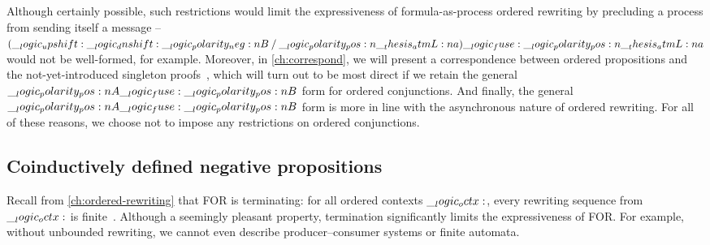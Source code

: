 Although certainly possible, such restrictions would limit the expressiveness of formula-as-process ordered rewriting by precluding a process from sending itself a message -- $(\__logic_upshift: \__logic_dnshift: \__logic_polarity_neg:n {B} \mathbin { / } \__logic_polarity_pos:n {\__thesis_atmL:n {a}}) \__logic_fuse: \__logic_polarity_pos:n {\__thesis_atmL:n {a}}$ would not be well-formed, for example.
Moreover, in \cref{ch:correspond}, we will present a correspondence between ordered propositions and the not-yet-introduced singleton proofs~, which will turn out to be most direct if we retain the general $\__logic_polarity_pos:n {A} \__logic_fuse: \__logic_polarity_pos:n {B}$ form for ordered conjunctions.
And finally, the general $\__logic_polarity_pos:n {A} \__logic_fuse: \__logic_polarity_pos:n {B}$ form is more in line with the asynchronous nature of ordered rewriting.
For all of these reasons, we choose not to impose any restrictions on ordered conjunctions.





\subsection{Coinductively defined negative propositions}\label{sec:formula-as-process:coinductive}

Recall from \cref{ch:ordered-rewriting} that \acl{FOR} is terminating: for all ordered contexts $\__logic_octx:$, every rewriting sequence from $\__logic_octx:$ is finite~.
Although a seemingly pleasant property, termination significantly limits the expressiveness of \acl{FOR}.
For example, without unbounded rewriting, we cannot even describe producer--consumer systems or finite automata.


